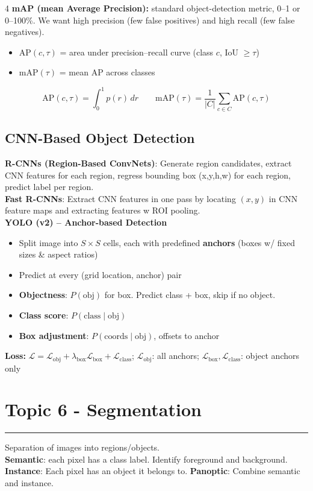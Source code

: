 \documentclass[10pt]{extarticle}
\newcommand{\sectionrule}{\vspace{-2pt}\hrule\vspace{2pt}}
\begin{document}
\begin{multicols}{4}
\textbf{mAP (mean Average Precision):} standard object-detection metric, 0--1 or 0--100\%. We want high precision (few false positives) and high recall (few false negatives).

\begin{itemize}
    \item AP$(c,\tau)$ = area under precision--recall curve (class $c$, IoU $\geq \tau$)
    \item mAP$(\tau)$ = mean AP across classes
\end{itemize}
\vspace{-1em}

\[
\text{AP}(c,\tau) = \int_0^1 p(r)\,dr \qquad \text{mAP}(\tau) = \frac{1}{|C|}\sum_{c \in C} \text{AP}(c,\tau)
\]

\subsection{CNN-Based Object Detection}
\textbf{R-CNNs (Region-Based ConvNets)}: Generate region candidates, extract CNN features for each region, regress bounding box (x,y,h,w) for each region, predict label per region. \\
\textbf{Fast R-CNNs}: Extract CNN features in one pass by locating $(x, y)$ in CNN feature maps and extracting features w ROI pooling. \\
\textbf{YOLO (v2) -- Anchor-based Detection}
\begin{itemize}
  \item Split image into $S \times S$ cells, each with predefined \textbf{anchors} (boxes w/ fixed sizes \& aspect ratios)
  \item Predict at every (grid location, anchor) pair
  \item \textbf{Objectness}: $P(\text{obj})$ for box. Predict class + box, skip if no object.
  \item \textbf{Class score}: $P(\text{class} \mid \text{obj})$
  \item \textbf{Box adjustment}: $P(\text{coords} \mid \text{obj})$, offsets to anchor
\end{itemize}
\textbf{Loss:} 
$\mathcal{L}=\mathcal{L}_{\text{obj}}+\lambda_{\text{box}}\mathcal{L}_{\text{box}}+\mathcal{L}_{\text{class}}$;
\footnotesize $\mathcal{L}_{\text{obj}}$: all anchors; $\mathcal{L}_{\text{box}},\mathcal{L}_{\text{class}}$: object anchors only

\section*{Topic 6 - Segmentation}
\sectionrule
Separation of images into regions/objects. \\
\textbf{Semantic}: each pixel has a class label. Identify foreground and background. \\ 
\textbf{Instance}: Each pixel has an object it belongs to.
\textbf{Panoptic}: Combine semantic and instance.


\end{multicols}
\end{document}
